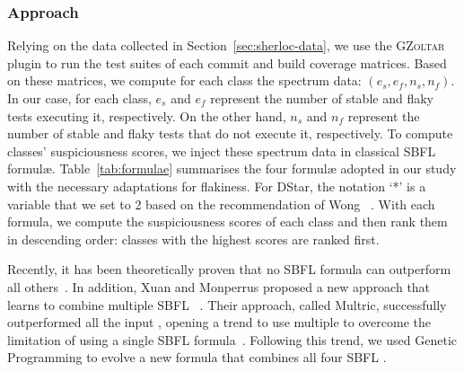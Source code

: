 \subsubsection{Approach}\label{subsub:rq1_approach}
Relying on the data collected in Section~\ref{sec:sherloc-data}, we use the \textsc{GZoltar} plugin to run the test suites of each commit and build coverage matrices.
Based on these matrices, we compute for each class the spectrum data: $(e_{s}, e_{f} , n_{s}, n_{f})$.
In our case, for each class, $e_{s}$ and $e_{f}$ represent the number of stable and flaky tests executing it, respectively.
On the other hand, $n_{s}$ and $n_{f}$ represent the number of stable and flaky tests that do not execute it, respectively.
To compute classes' suspiciousness scores, we inject these spectrum data in classical SBFL formulæ.
Table~\ref{tab:formulae} summarises the four formulæ adopted in our study with the necessary adaptations for flakiness.
For DStar, the notation ‘*’ is a variable that we set to 2 based on the recommendation of Wong \etal~\cite{wong-dstar}.
With each formula, we compute the suspiciousness scores of each class and then rank them in descending order: classes with the highest scores are ranked first.

Recently, it has been  theoretically proven that no SBFL formula can outperform all others~\cite{Yoo:2014fv}. In addition, Xuan and Monperrus proposed a new approach that learns to combine multiple SBFL \formulas~\cite{monperrus-ICSME}. Their approach, called Multric, successfully outperformed all the input \formulas, opening a trend to use multiple \formulas to overcome the limitation of using a single SBFL formula~\cite{B.-Le:2016yu,zou2019empirical,Li:2019:issta}. 
Following this trend, we used Genetic Programming to evolve a new formula that combines all four SBFL \formulas. 

